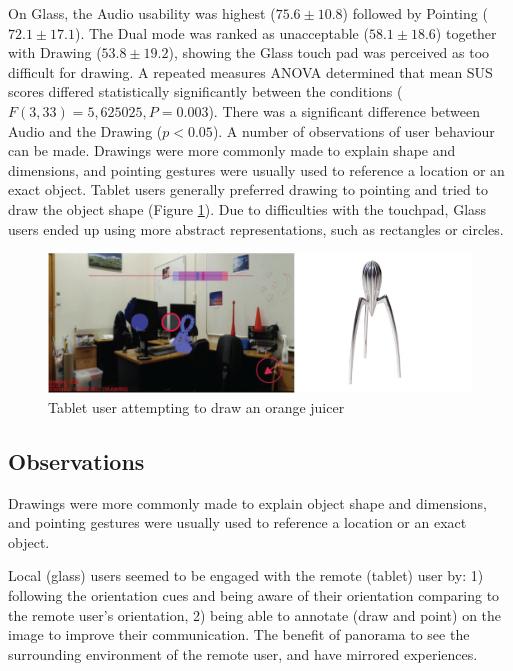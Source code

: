 On Glass, the Audio usability was highest ($75.6\pm10.8$) followed by Pointing ($72.1\pm17.1$). The Dual mode was ranked as unacceptable ($58.1\pm18.6$) together with Drawing ($53.8\pm19.2$), showing the Glass touch pad was perceived as too difficult for drawing. A repeated measures ANOVA determined that mean SUS scores differed statistically significantly between the conditions ($F(3, 33)=5,625025, P=0.003$). There was a significant difference between Audio and the Drawing ($p<0.05$). A number of observations of user behaviour can be made. Drawings were more commonly made to explain shape and dimensions, and pointing gestures were usually used to reference a location or an exact object. Tablet users generally preferred drawing to pointing and tried to draw the object shape (Figure \ref{fig:ismar14:tablet-drawing}). Due to difficulties with the touchpad, Glass users ended up using more abstract representations, such as rectangles or circles.

\begin{figure}[ht]
	\centering
	\includegraphics[width=\linewidth]{images/ismar14/tablet-drawing}
	\caption{Tablet user attempting to draw an orange juicer}
	\label{fig:ismar14:tablet-drawing}
\end{figure}

\subsection{Observations}

Drawings were more commonly made to explain object shape and dimensions, and pointing gestures were usually used to reference a location or an exact object.

Local (glass) users seemed to be engaged with the remote (tablet) user by: 1) following the orientation cues and being aware of their orientation comparing to the remote user's orientation, 2) being able to annotate (draw and point) on the image to improve their communication. The benefit of panorama to see the surrounding environment of the remote user, and have mirrored experiences.

